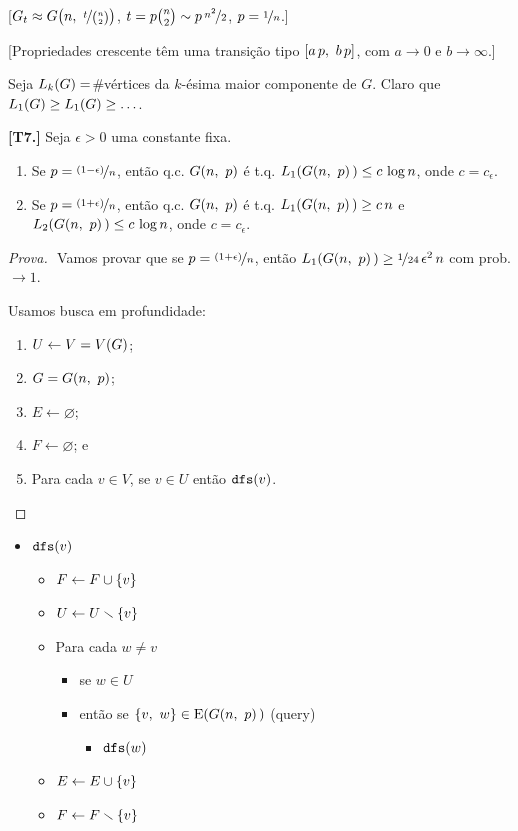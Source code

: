 {[$G_t\approx G\l(n,\ \nf{t}{\binom{n}{2}}\r)$, $t=p\binom{n}{2}\sim p\,\nicefrac{n^2}{2}$, $p=\nicefrac{1}{n}$.]

[Propriedades crescente têm uma transição tipo $\l[a\,p,\ b\,p\r]$, com $a\rightarrow0$ e $b\rightarrow\infty$.]

Seja $L_k\l(G\r)=$\#vértices da $k$-ésima maior componente de $G$. Claro que $L_1\l(G\r)\geq L_1\l(G\r)\geq\ldots$.

\begin{teorema}
  \normalfont\textbf{[T7.]}
  Seja $\epsilon>0$ uma constante fixa.
  \begin{enumerate}
    \item Se $p=\nf{\l(1-\epsilon\r)}{n}$, então q.c. $G\l(n,\ p\r)$ é t.q. $L_1\l(G\l(n,\ p\r)\r)\leq c\,\log n$, onde $c=c_\epsilon$.
    \item Se $p=\nf{\l(1+\epsilon\r)}{n}$, então q.c. $G\l(n,\ p\r)$ é t.q. $L_1\l(G\l(n,\ p\r)\r)\geq c\,n$ e $L_2\l(G\l(n,\ p\r)\r)\leq c\,\log n$, onde $c=c_\epsilon$.
  \end{enumerate}
\end{teorema}

\begin{proof}[Prova]$ $\newline
  Vamos provar que se $p=\nf{\l(1+\epsilon\r)}{n}$, então $L_1\l(G\l(n,\ p\r)\r)\geq\nf{1}{24}\,\epsilon^2\,n$ com prob. $\rightarrow1$.

  Usamos busca em profundidade:
  \begin{enumerate}
    \item $U\leftarrow V=V\l(G\r)$;
    \item $G=G\l(n,\ p\r)$;
    \item $E\leftarrow\varnothing$;
    \item $F\leftarrow\varnothing$; e
    \item Para cada $v\in V$, se $v\in U$ então $\texttt{dfs}\l(v\r)$.
  \end{enumerate}
\end{proof}

\begin{itemize}[label={}]
  \item $\texttt{dfs}\l(v\r)$
  \begin{itemize}[label={}]
    \item $F\leftarrow F\cup\l\{v\r\}$
    \item $U\leftarrow U\setminus\l\{v\r\}$
    \item Para cada $w\neq v$
    \begin{itemize}[label={}]
      \item se $w\in U$
      \item então se $\l\{v,\ w\r\}\in\E\l(G\l(n,\ p\r)\r)$ (query)
      \begin{itemize}[label={}]
        \item $\texttt{dfs}\l(w\r)$
      \end{itemize}
    \end{itemize}
    \item $E\leftarrow E\cup\l\{v\r\}$
    \item $F\leftarrow F\setminus\l\{v\r\}$
  \end{itemize}
\end{itemize}

}
